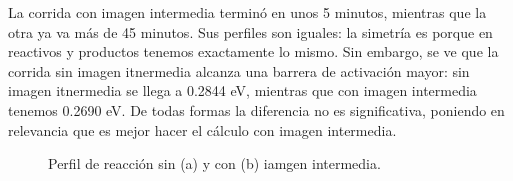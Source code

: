   La corrida con imagen intermedia terminó en unos 5 minutos, mientras que la otra ya va más de 45 minutos. Sus perfiles son iguales: la simetría es porque en reactivos y productos tenemos exactamente lo mismo. Sin embargo, se ve que la corrida sin imagen itnermedia alcanza una barrera de activación mayor: sin imagen itnermedia se llega a 0.2844 eV, mientras que con imagen intermedia tenemos 0.2690 eV. De todas formas la diferencia no es significativa, poniendo en relevancia que es mejor hacer el cálculo con imagen intermedia.

  \begin{figure}[H]
      \centering
       \caption{Perfil de reacción sin (a) y con (b) iamgen intermedia.}
   \end{figure}

